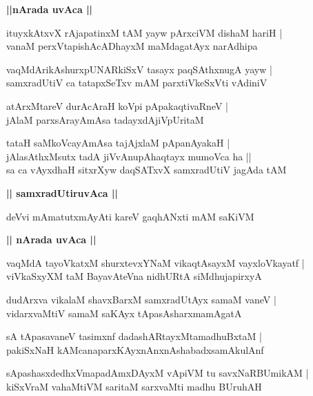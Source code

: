 \documentclass[twoside,12pt,openright]{book}
\newcounter{shloka}[chapter]
\def\uvaca#1{\centerline{{\large\textbf{#1}}}}
\begin{document}
\uvaca{||nArada uvAca ||}

\begin{shloka}%
ituyxkAtxvX rAjapatinxM tAM yayw pArxciVM dishaM hariH |\\
vanaM perxVtapishAcADhayxM maMdagatAyx narAdhipa 
\end{shloka}

\begin{shloka}%
vaqMdArikAshurxpUNARkiSxV tasayx paqSAthxnugA yayw |\\
samxradUtiV ca tatapxSeTxv mAM parxtiVkeSxVti vAdiniV 
\end{shloka}

\begin{shloka}%
atArxMtareV durAcAraH koVpi pApakaqtivaRneV |\\
jAlaM parxsArayAmAsa tadayxdAjiVpUritaM 
\end{shloka}

\begin{shloka}%
tataH saMkoVcayAmAsa tajAjxlaM pApanAyakaH |\\
jAlasAthxMsutx tadA jiVvAnupAhaqtayx mumoVca ha ||\\
sa ca vAyxdhaH sitxrXyw daqSATxvX samxradUtiV jagAda tAM 
\end{shloka}

\uvaca{|| samxradUtiruvAca ||}

\begin{shloka}%
deVvi mAmatutxmAyAti kareV gaqhANxti mAM saKiVM 
\end{shloka}

\uvaca{|| nArada uvAca ||}

\begin{shloka}%
vaqMdA tayoVkatxM shurxtevxYNaM vikaqtAsayxM vayxloVkayatf |\\
viVkaSxyXM taM BayavAteVna nidhURtA siMdhujapirxyA 
\end{shloka}

\begin{shloka}%
dudArxva vikalaM shavxBarxM samxradUtAyx samaM vaneV |\\
vidarxvaMtiV samaM saKAyx tApasAsharxmamAgatA 
\end{shloka}

\begin{shloka}%
sA tApasavaneV tasimxnf dadashARtayxMtamadhuBxtaM |\\
pakiSxNaH kAMcanaparxKAyxnAnxnAshabadxsamAkulAnf 
\end{shloka}

\begin{shloka}%
sApashasxdedhxVmapadAmxDAyxM vApiVM tu savxNaRBUmikAM |\\
kiSxVraM vahaMtiVM saritaM sarxvaMti madhu BUruhAH 
\end{shloka}
\end{document}
